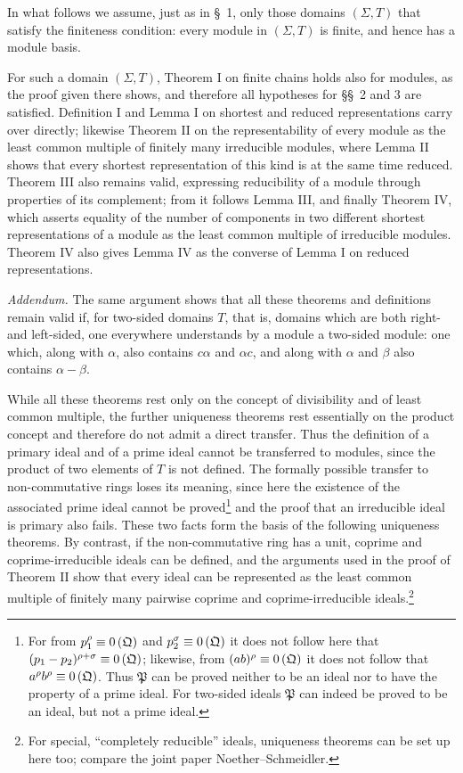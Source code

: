 \documentclass[11pt]{article}
\providecommand{\ideal}[1]{\mathfrak{#1}}
\begin{document}
In what follows we assume, just as in \S~1, only those domains $(\Sigma,T)$ that satisfy the finiteness condition: every module in $(\Sigma,T)$ is finite, and hence has a module basis.

For such a domain $(\Sigma,T)$, Theorem I on finite chains holds also for modules, as the proof given there shows, and therefore all hypotheses for \S\S~2 and 3 are satisfied. Definition I and Lemma I on shortest and reduced representations carry over directly; likewise Theorem II on the representability of every module as the least common multiple of finitely many irreducible modules, where Lemma II shows that every shortest representation of this kind is at the same time reduced. Theorem III also remains valid, expressing reducibility of a module through properties of its complement; from it follows Lemma III, and finally Theorem IV, which asserts equality of the number of components in two different shortest representations of a module as the least common multiple of irreducible modules. Theorem IV also gives Lemma IV as the converse of Lemma I on reduced representations.

\emph{Addendum.} The same argument shows that all these theorems and definitions remain valid if, for two-sided domains $T$, that is, domains which are both right- and left-sided, one everywhere understands by a module a two-sided module: one which, along with $\alpha$, also contains $c\alpha$ and $\alpha c$, and along with $\alpha$ and $\beta$ also contains $\alpha-\beta$.

While all these theorems rest only on the concept of divisibility and of least common multiple, the further uniqueness theorems rest essentially on the product concept and therefore do not admit a direct transfer. Thus the definition of a primary ideal and of a prime ideal cannot be transferred to modules, since the product of two elements of $T$ is not defined. The formally possible transfer to non-commutative rings loses its meaning, since here the existence of the associated prime ideal cannot be proved\footnote{For from $p_1^\rho\eqzero{\ideal Q}$ and $p_2^\sigma\eqzero{\ideal Q}$ it does not follow here that $(p_1-p_2)^{\rho+\sigma}\eqzero{\ideal Q}$; likewise, from $(ab)^\rho\eqzero{\ideal Q}$ it does not follow that $a^\rho b^\rho\eqzero{\ideal Q}$. Thus $\ideal P$ can be proved neither to be an ideal nor to have the property of a prime ideal. For two-sided ideals $\ideal P$ can indeed be proved to be an ideal, but not a prime ideal.} and the proof that an irreducible ideal is primary also fails. These two facts form the basis of the following uniqueness theorems. By contrast, if the non-commutative ring has a unit, coprime and coprime-irreducible ideals can be defined, and the arguments used in the proof of Theorem II show that every ideal can be represented as the least common multiple of finitely many pairwise coprime and coprime-irreducible ideals.\footnote{For special, ``completely reducible'' ideals, uniqueness theorems can be set up here too; compare the joint paper Noether--Schmeidler.}
\end{document}
